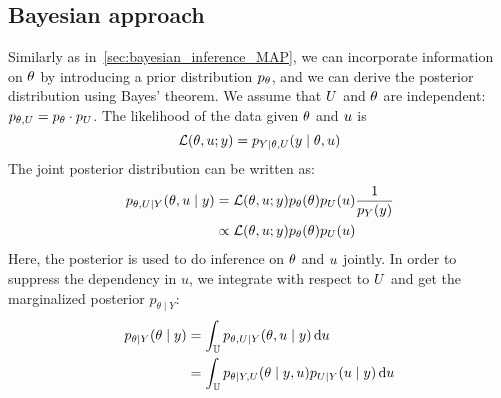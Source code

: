 \documentclass[../../Main_ManuscritThese.tex]{subfiles}
\begin{document}
\subsection{Bayesian approach}
Similarly as in~\cref{sec:bayesian_inference_MAP}, we can incorporate
information on $\theta$ by introducing a prior distribution $p_{\theta}$,
and we can derive the posterior distribution using Bayes' theorem. We
assume that $U$ and $\theta$ are independent:
$p_{\theta, U} = p_{\theta}\cdot p_{U}$.  The likelihood of the data
given $\theta$ and $u$ is
\begin{equation}
  \mathcal{L}(\theta,u;y) = p_{Y \mid \theta, U}(y\mid \theta,u)
\end{equation}
The joint posterior distribution can be written as:
\begin{align}
  p_{\theta,U \mid Y}(\theta,u \mid y) &= \mathcal{L}(\theta,u;y)p_{\theta}(\theta)p_{U}(u) \frac{1}{p_Y(y)} \\
  &\propto \mathcal{L}(\theta,u;y)p_{\theta}(\theta)p_{U}(u)
\end{align}
Here, the posterior is used to do inference on $\theta$ and $u$
jointly. In order to suppress the dependency in $u$, we integrate with
respect to $U$ and get the marginalized posterior
$p_{\theta \mid Y}$:
\begin{align}
  p_{\theta \mid Y}(\theta \mid y) &= \int_{\mathbb{U}} p_{\theta,U\mid Y}(\theta,u\mid y)\,\mathrm{d}u \label{eq:marg_MMAP}\\
                             &= \int_{\mathbb{U}}p_{\theta \mid Y, U}(\theta \mid y, u) p_{U\mid Y}(u \mid y)\,\mathrm{d}u
\end{align}
\end{document}
